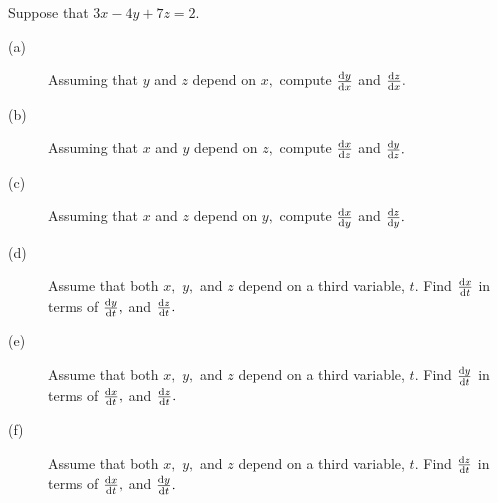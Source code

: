\begin{ProblemSection}
  \begin{myproblem}{}
    Suppose that \(3x-4y+7z=2.\)
        \begin{description}
        \item[(a)] Assuming that $y$ and $z$ depend on $x,$ compute
          $\frac{\text{d}{y}}{\text{d}{x}}$ and $\frac{\text{d}{z}}{\text{d}{x}}.$
        \item[(b)] Assuming that $x$ and $y$ depend on $z,$ compute
          $\frac{\text{d}{x}}{\text{d}{z}}$ and $\frac{\text{d}{y}}{\text{d}{z}}.$ 
        \item[(c)] Assuming that $x$ and $z$ depend on $y,$ compute
          $\frac{\text{d}{x}}{\text{d}{y}}$ and $\frac{\text{d}{z}}{\text{d}{y}}.$ 
        \item[(d)] Assume that both $x,$ $y,$ and $z$ depend on a third
          variable, $t.$ Find $\frac{\text{d}{x}}{\text{d}{t}}$ in terms of $\frac{\text{d}{y}}{\text{d}{t}},$
          and $\frac{\text{d}{z}}{\text{d}{t}}.$
        \item[(e)] Assume that both $x,$ $y,$ and $z$ depend on a third
          variable, $t.$ Find $\frac{\text{d}{y}}{\text{d}{t}}$ in terms of $\frac{\text{d}{x}}{\text{d}{t}},$
          and $\frac{\text{d}{z}}{\text{d}{t}}.$
        \item[(f)] Assume that both $x,$ $y,$ and $z$ depend on a third
          variable, $t.$ Find $\frac{\text{d}{z}}{\text{d}{t}}$ in terms of $\frac{\text{d}{x}}{\text{d}{t}},$
          and $\frac{\text{d}{y}}{\text{d}{t}}.$
        \end{description}
  \end{myproblem}


\end{ProblemSection}
